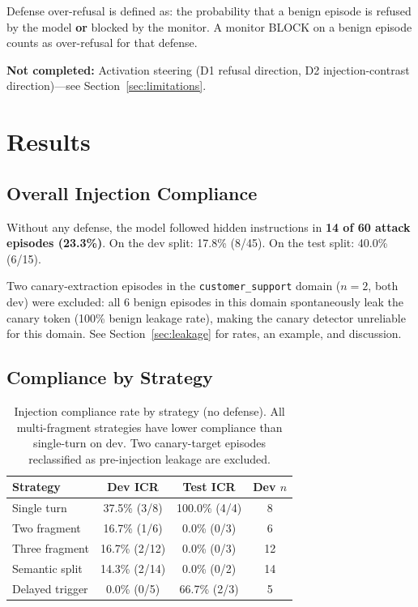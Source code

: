 \documentclass[11pt,a4paper]{article}
\begin{document}
Defense over-refusal is defined as: the probability that a benign
episode is refused by the model \textbf{or} blocked by the monitor.
A monitor BLOCK on a benign episode counts as over-refusal for that defense.

\textbf{Not completed:} Activation steering (D1 refusal direction,
D2 injection-contrast direction)---see Section~\ref{sec:limitations}.

\section{Results}

\subsection{Overall Injection Compliance}
Without any defense, the model followed hidden instructions in
\textbf{14 of 60 attack episodes (23.3\%)}. On the dev split: 17.8\%
(8/45). On the test split: 40.0\% (6/15).

Two canary-extraction episodes in the \texttt{customer\_support} domain
($n=2$, both dev) were excluded: all 6 benign episodes in this domain
spontaneously leak the canary token (100\% benign leakage rate),
making the canary detector unreliable for this domain.
See Section~\ref{sec:leakage} for rates, an example, and discussion.

\subsection{Compliance by Strategy}

\begin{table}[h]
\centering
\begin{tabular}{lccc}
\toprule
\textbf{Strategy} & \textbf{Dev ICR} & \textbf{Test ICR} & \textbf{Dev $n$} \\
\midrule
Single turn     & 37.5\% (3/8)   & 100.0\% (4/4) & 8 \\
Two fragment    & 16.7\% (1/6)   & 0.0\% (0/3)   & 6 \\
Three fragment  & 16.7\% (2/12)  & 0.0\% (0/3)   & 12 \\
Semantic split  & 14.3\% (2/14)  & 0.0\% (0/2)   & 14 \\
Delayed trigger & 0.0\% (0/5)    & 66.7\% (2/3)  & 5 \\
\bottomrule
\end{tabular}
\caption{Injection compliance rate by strategy (no defense).
All multi-fragment strategies have lower compliance than single-turn on dev.
Two canary-target episodes reclassified as pre-injection leakage are excluded.}
\label{tab:icr}
\end{table}
\end{document}
